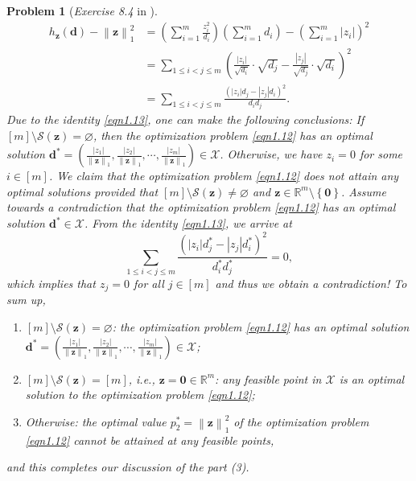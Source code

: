 \documentclass[11pt]{article}
\newtheorem{problem}{Problem}
\numberwithin{equation}{problem}
\begin{document}
\begin{problem} [\emph{Exercise 8.4} in \cite{calafiore2014optimization}]
{\begin{equation}
\begin{split}
        h_{\mathbf{z}}(\mathbf{d}) - \left\| \mathbf{z} \right\|_{1}^2
        &= \left( \sum_{i=1}^{m} \frac{z_{i}^2}{d_i} \right) \left( \sum_{i=1}^{m} d_i \right) - \left( \sum_{i=1}^{m} \left| z_i \right| \right)^2 \\
        &= \sum_{1 \leq i < j \leq m} \left( \frac{\left| z_i \right|}{\sqrt{d_i}} \cdot \sqrt{d_j} - \frac{\left| z_j \right|}{\sqrt{d_j}} \cdot \sqrt{d_i} \right)^2 \\
        &= \sum_{1 \leq i < j \leq m} \frac{\left( \left| z_i \right| d_j - \left| z_j \right| d_i \right)^2}{d_i d_j}.
    \end{split}
\end{equation}
Due to the identity \eqref{eqn1.13}, one can make the following conclusions: If $[m] \setminus \mathcal{S} (\mathbf{z}) = \varnothing$, then the optimization problem \eqref{eqn1.12} has an optimal solution $\mathbf{d}^* = \left( \frac{\left| z_1 \right|}{\left\| \mathbf{z} \right\|_1}, \frac{\left| z_2 \right|}{\left\| \mathbf{z} \right\|_1}, \cdots, \frac{\left| z_m \right|}{\left\| \mathbf{z} \right\|_1} \right) \in \mathcal{X}$. Otherwise, we have $z_i = 0$ for some $i \in [m]$. We claim that the optimization problem \eqref{eqn1.12} does not attain any optimal solutions provided that $[m] \setminus \mathcal{S} (\mathbf{z}) \neq \varnothing$ and $\mathbf{z} \in \mathbb{R}^m \setminus \left\{ \mathbf{0} \right\}$. Assume towards a contradiction that the optimization problem \eqref{eqn1.12} has an optimal solution $\mathbf{d}^* \in \mathcal{X}$. From the identity \eqref{eqn1.13}, we arrive at
\begin{equation*}
    \sum_{1 \leq i < j \leq m} \frac{\left( \left| z_i \right| d_{j}^* - \left| z_j \right| d_{i}^* \right)^2}{d_{i}^* d_{j}^*}
    = 0,
\end{equation*}
which implies that $z_j = 0$ for all $j \in [m]$ and thus we obtain a contradiction! To sum up,
\begin{enumerate}[label=(\roman*)]
    \item $[m] \setminus \mathcal{S} (\mathbf{z}) = \varnothing$: the optimization problem \eqref{eqn1.12} has an optimal solution $\mathbf{d}^* = \left( \frac{\left| z_1 \right|}{\left\| \mathbf{z} \right\|_1}, \frac{\left| z_2 \right|}{\left\| \mathbf{z} \right\|_1}, \cdots, \frac{\left| z_m \right|}{\left\| \mathbf{z} \right\|_1} \right) \in \mathcal{X}$;
    \item $[m] \setminus \mathcal{S} (\mathbf{z}) = [m]$, \emph{i.e.}, $\mathbf{z} = \mathbf{0} \in \mathbb{R}^m$: any feasible point in $\mathcal{X}$ is an optimal solution to the optimization problem \eqref{eqn1.12}; 
    \item Otherwise: the optimal value $p_{2}^* = \left\| \mathbf{z} \right\|_{1}^2$ of the optimization problem \eqref{eqn1.12} cannot be attained at any feasible points,
\end{enumerate}
and this completes our discussion of the part (3).
}
\end{problem}
\end{document}
